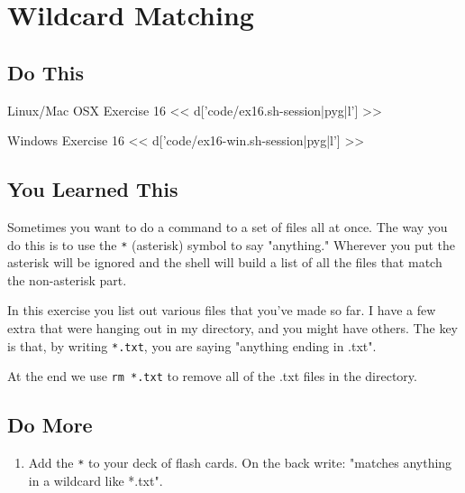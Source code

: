 \chapter{Wildcard Matching}

\section{Do This}

\begin{code}{Linux/Mac OSX Exercise 16}
<< d['code/ex16.sh-session|pyg|l'] >>
\end{code}

\begin{code}{Windows Exercise 16}
<< d['code/ex16-win.sh-session|pyg|l'] >>
\end{code}

\section{You Learned This}

Sometimes you want to do a command to a set of files all at once.  The way you do
this is to use the \verb|*| (asterisk) symbol to say "anything."  Wherever you
put the asterisk will be ignored and the shell will build a list of all the files
that match the non-asterisk part.

In this exercise you list out various files that you've made so far.  I have a
few extra that were hanging out in my directory, and you might have others.  The
key is that, by writing \verb|*.txt|, you are saying "anything ending in .txt".

At the end we use \verb|rm *.txt| to remove all of the .txt files in the
 directory.

\section{Do More}

\begin{enumerate}
\item Add the \verb|*| to your deck of flash cards.  On the back write: "matches anything in a wildcard like *.txt".
\end{enumerate}

